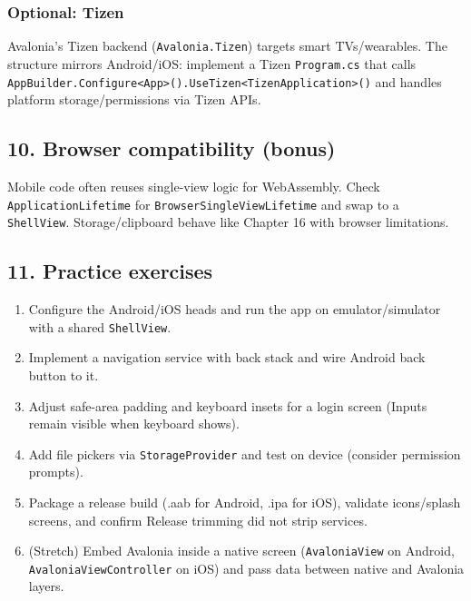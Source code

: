 \subsubsection{Optional: Tizen}\label{optional-tizen}

Avalonia's Tizen backend (\passthrough{\lstinline!Avalonia.Tizen!})
targets smart TVs/wearables. The structure mirrors Android/iOS:
implement a Tizen \passthrough{\lstinline!Program.cs!} that calls
\passthrough{\lstinline!AppBuilder.Configure<App>().UseTizen<TizenApplication>()!}
and handles platform storage/permissions via Tizen APIs.

\subsection{10. Browser compatibility
(bonus)}\label{browser-compatibility-bonus}

Mobile code often reuses single-view logic for WebAssembly. Check
\passthrough{\lstinline!ApplicationLifetime!} for
\passthrough{\lstinline!BrowserSingleViewLifetime!} and swap to a
\passthrough{\lstinline!ShellView!}. Storage/clipboard behave like
Chapter 16 with browser limitations.

\subsection{11. Practice exercises}\label{practice-exercises-13}

\begin{enumerate}
\def\labelenumi{\arabic{enumi}.}
\tightlist
\item
  Configure the Android/iOS heads and run the app on emulator/simulator
  with a shared \passthrough{\lstinline!ShellView!}.
\item
  Implement a navigation service with back stack and wire Android back
  button to it.
\item
  Adjust safe-area padding and keyboard insets for a login screen
  (Inputs remain visible when keyboard shows).
\item
  Add file pickers via \passthrough{\lstinline!StorageProvider!} and
  test on device (consider permission prompts).
\item
  Package a release build (.aab for Android, .ipa for iOS), validate
  icons/splash screens, and confirm Release trimming did not strip
  services.
\item
  (Stretch) Embed Avalonia inside a native screen
  (\passthrough{\lstinline!AvaloniaView!} on Android,
  \passthrough{\lstinline!AvaloniaViewController!} on iOS) and pass data
  between native and Avalonia layers.
\end{enumerate}

